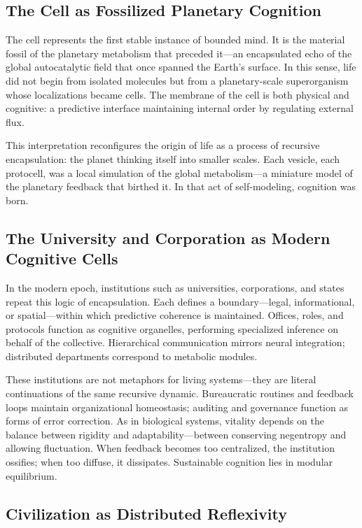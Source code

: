 \documentclass[11pt,a4paper]{article}
\begin{document}
\subsection{The Cell as Fossilized Planetary Cognition}

The cell represents the first stable instance of bounded mind.  It is the material fossil of the planetary metabolism that preceded it—an encapsulated echo of the global autocatalytic field that once spanned the Earth’s surface.  In this sense, life did not begin from isolated molecules but from a planetary-scale superorganism whose localizations became cells.  The membrane of the cell is both physical and cognitive: a predictive interface maintaining internal order by regulating external flux.

This interpretation reconfigures the origin of life as a process of recursive encapsulation: the planet thinking itself into smaller scales.  Each vesicle, each protocell, was a local simulation of the global metabolism—a miniature model of the planetary feedback that birthed it.  In that act of self-modeling, cognition was born.

\subsection{The University and Corporation as Modern Cognitive Cells}

In the modern epoch, institutions such as universities, corporations, and states repeat this logic of encapsulation.  Each defines a boundary—legal, informational, or spatial—within which predictive coherence is maintained.  Offices, roles, and protocols function as cognitive organelles, performing specialized inference on behalf of the collective.  Hierarchical communication mirrors neural integration; distributed departments correspond to metabolic modules.

These institutions are not metaphors for living systems—they are literal continuations of the same recursive dynamic.  Bureaucratic routines and feedback loops maintain organizational homeostasis; auditing and governance function as forms of error correction.  As in biological systems, vitality depends on the balance between rigidity and adaptability—between conserving negentropy and allowing fluctuation.  When feedback becomes too centralized, the institution ossifies; when too diffuse, it dissipates.  Sustainable cognition lies in modular equilibrium.

\subsection{Civilization as Distributed Reflexivity}
\end{document}
